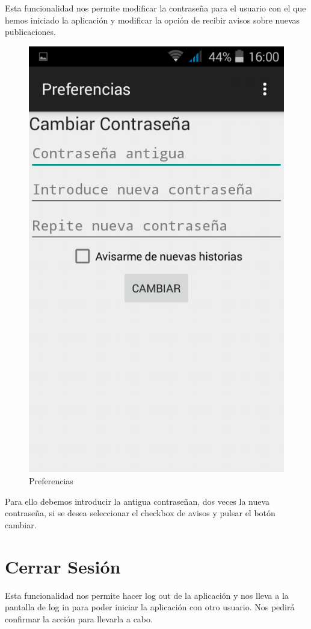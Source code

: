 \documentclass[11pt,a4paper, titlepage]{article}
\begin{document}
	Esta funcionalidad nos permite modificar la contraseña para el usuario con el que hemos iniciado la aplicación y modificar la opción de recibir avisos sobre nuevas publicaciones.
	
	\begin{figure}[hbtp]
		\centering
		\includegraphics[scale = 0.25 ]{img/9}
		\caption{Preferencias}
		\label{p16}
	\end{figure}
	
	Para ello debemos introducir la antigua contraseñan, dos veces la nueva contraseña, si se desea seleccionar el checkbox de avisos y pulsar el botón cambiar.
	
	\FloatBarrier
	\section[Cerrar Sesión]{Cerrar Sesión}
	Esta funcionalidad nos permite hacer log out de la aplicación y nos lleva a la pantalla de log in para poder iniciar la aplicación con otro usuario. Nos pedirá confirmar la acción para llevarla a cabo. 
	
\end{document}
